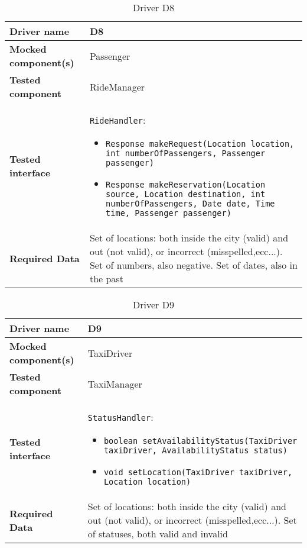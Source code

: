\begin{table}[H]
	\begin{tabular}{ l | p{} }
		\textbf{Driver name} & D8\label{D8} \\ \hline
		\textbf{Mocked component(s)} & Passenger \\ \hline
		\textbf{Tested component} & RideManager \\ \hline
		\textbf{Tested interface} & \texttt{RideHandler}:
		\begin{itemize}
			\item \texttt{Response makeRequest(Location location, int numberOfPassengers, Passenger passenger)}
			\item \texttt{Response makeReservation(Location source, Location destination, int numberOfPassengers, Date date, Time time, Passenger passenger)}
		\end{itemize} \\ \hline
		\textbf{Required Data} & Set of locations: both inside the city (valid) and out (not valid), or incorrect (misspelled,ecc...). Set of numbers, also negative. Set of dates, also in the past
	\end{tabular}
	\caption{Driver D8}
\end{table}

\begin{table}[H]
	\begin{tabular}{ l | p{} }
		\textbf{Driver name} & D9\label{D9} \\ \hline
		\textbf{Mocked component(s)} & TaxiDriver \\ \hline
		\textbf{Tested component} & TaxiManager \\ \hline
		\textbf{Tested interface} & \texttt{StatusHandler}:
		\begin{itemize}
			\item \texttt{boolean setAvailabilityStatus(TaxiDriver taxiDriver, AvailabilityStatus status)}
			\item \texttt{void setLocation(TaxiDriver taxiDriver, Location location)}
		\end{itemize} \\ \hline
		\textbf{Required Data} & Set of locations: both inside the city (valid) and out (not valid), or incorrect (misspelled,ecc...). Set of statuses, both valid and invalid
	\end{tabular}
	\caption{Driver D9}
\end{table}